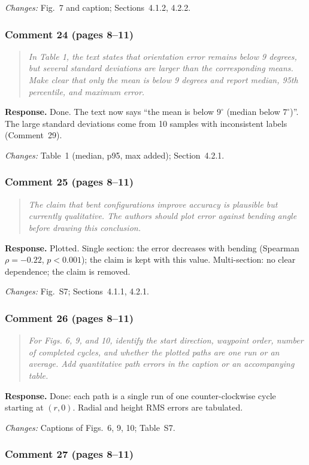 \documentclass[11pt,a4paper]{article}
\newcommand{\rc}[1]{\begin{quote}\color{black!70}\itshape #1\end{quote}}
\begin{document}
\textit{Changes:} Fig.~7 and caption; Sections~4.1.2, 4.2.2.

\subsubsection*{Comment 24 (pages 8--11)}

\rc{In Table 1, the text states that orientation error remains below 9 degrees, but several standard deviations are larger than the corresponding means. Make clear that only the mean is below 9 degrees and report median, 95th percentile, and maximum error.}
\textbf{Response.} Done. The text now says ``the mean is below $9^\circ$ (median below $7^\circ$)''. The large standard deviations come from 10 samples with inconsistent labels (Comment~29).

\textit{Changes:} Table~1 (median, p95, max added); Section~4.2.1.

\subsubsection*{Comment 25 (pages 8--11)}

\rc{The claim that bent configurations improve accuracy is plausible but currently qualitative. The authors should plot error against bending angle before drawing this conclusion.}
\textbf{Response.} Plotted. Single section: the error decreases with bending (Spearman $\rho = -0.22$, $p < 0.001$); the claim is kept with this value. Multi-section: no clear dependence; the claim is removed.

\textit{Changes:} Fig.~S7; Sections~4.1.1, 4.2.1.

\subsubsection*{Comment 26 (pages 8--11)}

\rc{For Figs. 6, 9, and 10, identify the start direction, waypoint order, number of completed cycles, and whether the plotted paths are one run or an average. Add quantitative path errors in the caption or an accompanying table.}
\textbf{Response.} Done: each path is a single run of one counter-clockwise cycle starting at $(r, 0)$. Radial and height RMS errors are tabulated.

\textit{Changes:} Captions of Figs.~6, 9, 10; Table~S7.

\subsubsection*{Comment 27 (pages 8--11)}
\end{document}
